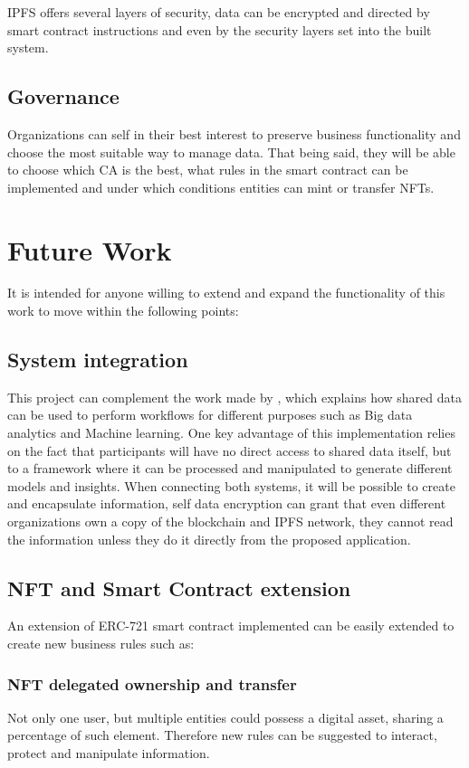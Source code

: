 \documentclass[a4paper]{article}
\begin{document}
IPFS offers several layers of security, data can be encrypted and directed by smart contract instructions and even by the security layers set into the built system. 

\subsection{Governance}
Organizations can self in their best interest to preserve business functionality and choose the most suitable way to manage data. That being said, they will be able to choose which CA is the best, what rules in the smart contract can be implemented and under which conditions entities can mint or transfer NFTs.


\section{Future Work}
It is intended for anyone willing to extend and expand the functionality of this work to move within the following points:
\subsection{System integration}
This project can complement the work made by \cite{akbarAli}, which explains how shared data can be used to perform workflows for different purposes such as Big data analytics and Machine learning. One key advantage of this implementation relies on the fact that participants will have no direct access to shared data itself, but to a framework where it can be processed and manipulated to generate different models and insights. When connecting both systems, it will be possible to create and encapsulate information, self data encryption can grant that even different organizations own a copy of the blockchain and IPFS network, they cannot read the information unless they do it directly from the proposed application.

\subsection{NFT and Smart Contract extension}
An extension of ERC-721\cite{ERC721No30} smart contract implemented can be easily extended to create new business rules such as:

\subsubsection{NFT delegated ownership and transfer}
Not only one user, but multiple entities could possess a digital asset, sharing a percentage of such element. Therefore new rules can be suggested to interact, protect and manipulate information.
\end{document}
